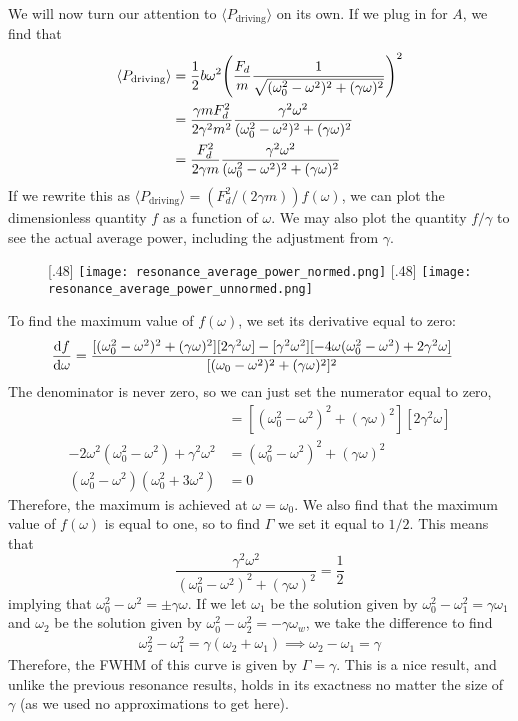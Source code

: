 We will now turn our attention to $\langle P_\text{driving}\rangle$ on its own. If we plug in for $A$, we find that
\begin{align*}
    \langle P_\text{driving}\rangle &= \frac{1}{2}b\omega^2 \pqty{\frac{F_d}{m}\frac{1}{\sqrt{(\omega_0^2-\omega^2)^2+(\gamma\omega)^2}}}^2 \\
    &= \frac{\gamma mF_d^2}{2\gamma^2m^2}\frac{\gamma^2\omega^2}{(\omega_0^2-\omega^2)^2+(\gamma\omega)^2} \\
    &= \frac{F_d^2}{2\gamma m}\frac{\gamma^2\omega^2}{(\omega_0^2-\omega^2)^2+(\gamma\omega)^2}
\end{align*}
If we rewrite this as $\langle P_\text{driving}\rangle = (F_d^2/(2\gamma m)) f(\omega)$, we can plot the dimensionless quantity $f$ as a function of $\omega$. We may also plot the quantity $f/\gamma$ to see the actual average power, including the adjustment from $\gamma$.
\begin{figure}[t!]
  \subcaptionbox*{}[.48\linewidth]{
    \texttt{[image: resonance\_average\_power\_normed.png]}
  }
  \hfill
  \subcaptionbox*{}[.48\linewidth]{
    \texttt{[image: resonance\_average\_power\_unnormed.png]}
  }
\end{figure}
To find the maximum value of $f(\omega)$, we set its derivative equal to zero:
\begin{align*}
    \dv{f}{\omega} &= \frac{[(\omega_0^2-\omega^2)^2+(\gamma\omega)^2][2\gamma^2\omega] - [\gamma^2\omega^2][-4\omega(\omega_0^2-\omega^2)+2\gamma^2\omega]}{[(\omega_0-\omega^2)^2 + (\gamma\omega)^2]^2} 
\end{align*}
The denominator is never zero, so we can just set the numerator equal to zero,
\begin{align*}
    [\gamma^2\omega^2][-4\omega(\omega_0^2-\omega^2)+2\gamma^2\omega] &= [(\omega_0^2-\omega^2)^2+(\gamma\omega)^2][2\gamma^2\omega] \\
    -2\omega^2(\omega_0^2-\omega^2)+\gamma^2\omega^2 &= (\omega_0^2-\omega^2)^2 +(\gamma\omega)^2 \\
    (\omega_0^2-\omega^2)(\omega_0^2+3\omega^2) &= 0
\end{align*}
Therefore, the maximum is achieved at $\omega=\omega_0$. We also find that the maximum value of $f(\omega)$ is equal to one, so to find $\Gamma$ we set it equal to $1/2$. This means that
\[ \frac{\gamma^2\omega^2}{(\omega_0^2-\omega^2)^2+(\gamma\omega)^2} = \frac{1}{2}\]
implying that $\omega_0^2-\omega^2 = \pm \gamma\omega$. If we let $\omega_1$ be the solution given by $\omega_0^2-\omega_1^2 = \gamma\omega_1$ and $\omega_2$ be the solution given by $\omega_0^2-\omega_2^2= -\gamma\omega_w$, we take the difference to find
\begin{align*}
    \omega_2^2 - \omega_1^2 = \gamma(\omega_2+\omega_1) \implies \omega_2-\omega_1 = \gamma
\end{align*}
Therefore, the FWHM of this curve is given by $\Gamma = \gamma$. This is a nice result, and unlike the previous resonance results, holds in its exactness no matter the size of $\gamma$ (as we used no approximations to get here).


